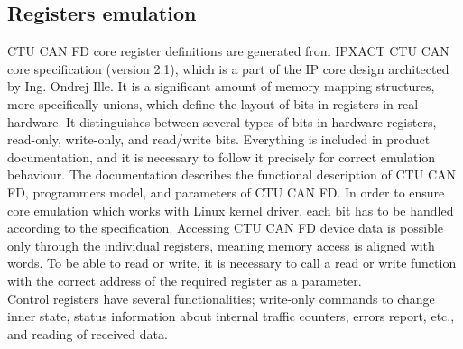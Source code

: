 \documentclass{ctuthesis}
\begin{document}
 \subsection{Registers emulation}
  CTU CAN FD core register definitions are generated from IPXACT CTU CAN core specification (version 2.1), which is a part of the IP core design architected by Ing. Ondrej Ille. It is a significant amount of memory mapping structures, more specifically unions, which define the layout of bits in registers in real hardware. It distinguishes between several types of bits in hardware registers, read-only, write-only, and read/write bits. Everything is included in product documentation, and it is necessary to follow it precisely for correct emulation behaviour. The documentation describes the functional description of CTU CAN FD, programmers model, and parameters of CTU CAN FD. In order to ensure core emulation which works with Linux kernel driver, each bit has to be handled according to the specification. Accessing CTU CAN FD device data is possible only through the individual registers, meaning memory access is aligned with words. To be able to read or write, it is necessary to call a read or write function with the correct address of the required register as a parameter. \\
  Control registers have several functionalities; write-only commands to change inner state, status information about internal traffic counters, errors report, etc., and reading of received data.
 
\end{document}
